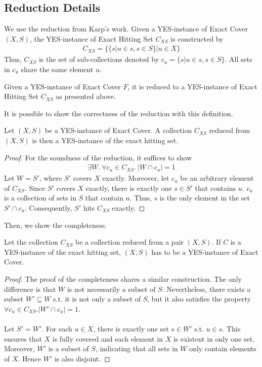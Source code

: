 \subsection{Reduction Details}
We use the reduction from Karp's work. Given a YES-instance of Exact Cover $(X, S)$, the YES-instance of Exact Hitting Set $C_{XS}$ is constructed by 
\begin{align*}
    C_{XS} = \{\{s | u \in s, s \in S \} | u \in X\}
\end{align*}
Thus, $C_{XS}$ is the set of sub-collections denoted by $c_u = \{s | u \in s, s \in S\}$. All sets in $c_u$ share the same element $u$.
\begin{definition}
    Given a YES-instance of Exact Cover $F$, 
    it is reduced to a YES-instance of Exact Hitting Set $C_{XS}$ as presented above.
\end{definition}
It is possible to show the correctness of the reduction with this definition.
\begin{lemma}[Soundness]
    \label{lemma:4}
    Let $(X, S)$ be a YES-instance of Exact Cover. A collection $C_{XS}$ reduced from $(X, S)$ is then a YES-instance of the exact hitting set.
\end{lemma}
\begin{proof}
For the soundness of the reduction, it suffices to show 
\begin{align*}
    \exists W.\ \forall c_u \in C_{XS}.\ |W \cap c_u| = 1
\end{align*}
Let $W = S'$, where $S'$ covers $X$ exactly. Moreover, let $c_u$ be an arbitrary element of $C_{XS}$. 
Since $S'$ covers $X$ exactly, there is exactly one $s \in S'$ that contains $u$. 
$c_u$ is a collection of sets in $S$ that contain $u$.
Thus, $s$ is the only element in the set $S' \cap c_u$. 
Consequently, $S'$ hits $C_{XS}$ exactly.
\end{proof}
Then, we show the completeness.
\begin{lemma}[Completeness]
    \label{lemma:5}
    Let the collection $C_{XS}$ be a collection reduced from a pair $(X, S)$. If $C$ is a YES-instance of the exact hitting set, 
    $(X, S)$ has to be a YES-instance of Exact Cover.
\end{lemma}
\begin{proof}
The proof of the completeness shares a similar construction. 
The only difference is that $W$ is not necessarily a subset of $S$.
Nevertheless, there exists a subset $W' \subseteq W$ s.t. it is not only a subset of $S$, but it
also satisfies the property $\forall c_u \in C_{XS}. |W' \cap c_u| = 1$. \\\\
Let $S' = W'$. For each $u \in X$, there is exactly one set $s \in W'$ s.t. $u \in s$. 
This ensures that $X$ is fully covered and each element in $X$ is existent in only one set.
Moreover, $W'$ is a subset of $S$, indicating that all sets in $W$ only contain elements of $X$. 
Hence $W'$ is also disjoint.  
\end{proof}
